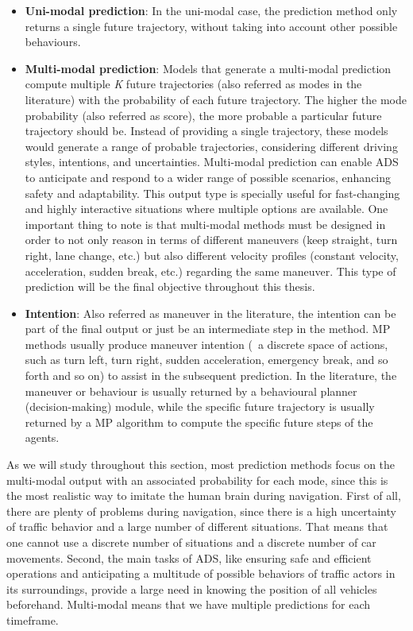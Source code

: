 \begin{itemize}
	
	\item \textbf{Uni-modal prediction}: In the uni-modal case, the prediction method only returns a single future trajectory, without taking into account other possible behaviours. 
	
	\item \textbf{Multi-modal prediction}: Models that generate a multi-modal prediction compute multiple \textit{K} future trajectories (also referred as modes in the literature) with the probability of each future trajectory. The higher the mode probability (also referred as score), the more probable a particular future trajectory should be. Instead of providing a single trajectory, these models would generate a range of probable trajectories, considering different driving styles, intentions, and uncertainties. Multi-modal prediction can enable \ac{ADS} to anticipate and respond to a wider range of possible scenarios, enhancing safety and adaptability. This output type is specially useful for fast-changing and highly interactive situations where multiple options are available. One important thing to note is that multi-modal methods must be designed in order to not only reason in terms of different maneuvers (keep straight, turn right, lane change, etc.) but also different velocity profiles (constant velocity, acceleration, sudden break, etc.) regarding the same maneuver. This type of prediction will be the final objective throughout this thesis.
	
	\item \textbf{Intention}: Also referred as maneuver in the literature, the intention can be part of the final output or just be an intermediate step in the method. \ac{MP} methods usually produce maneuver intention (\ie \ a discrete space of actions, such as turn left, turn right, sudden acceleration, emergency break, and so forth and so on) to assist in the subsequent prediction. In the literature, the maneuver or behaviour is usually returned by a behavioural planner (decision-making) module, while the specific future trajectory is usually returned by a \ac{MP} algorithm to compute the specific future steps of the agents.
\end{itemize}

As we will study throughout this section, most prediction methods focus on the multi-modal output with an associated probability for each mode, since this is the most realistic way to imitate the human brain during navigation. First of all, there are plenty of problems during navigation, since there is a high uncertainty of traffic behavior and a large number of different situations. That means that one cannot use a discrete number of situations and a discrete number of car movements. Second, the main tasks of \ac{ADS}, like ensuring safe and efficient operations and anticipating a multitude of possible behaviors of traffic actors in its surroundings, provide a large need in knowing the position of all vehicles beforehand. Multi-modal means that we have multiple predictions for each timeframe. 


